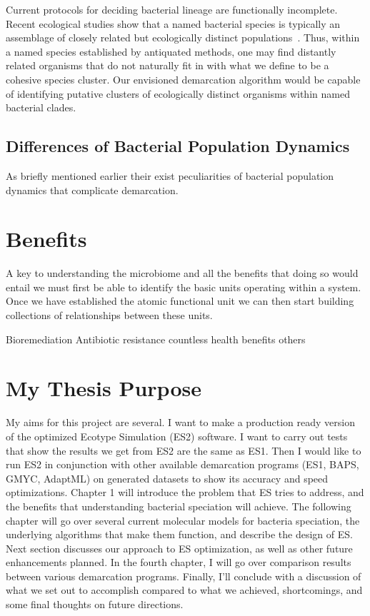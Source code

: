 Current protocols for deciding bacterial lineage are functionally incomplete. Recent ecological studies show that a named bacterial species is typically an assemblage of closely related but ecologically distinct populations~\cite{cohan2007systematics}.
Thus, within a named species established by antiquated methods, one may find distantly related organisms that do not naturally fit in with what we define to be a cohesive species cluster.
Our envisioned demarcation algorithm would be capable of identifying putative clusters of ecologically distinct organisms within named bacterial clades.


\subsection{Differences of Bacterial Population Dynamics}
As briefly mentioned earlier their exist peculiarities of bacterial population dynamics that complicate demarcation.

\section{Benefits}%
A key to understanding the microbiome and all the benefits that doing so would entail we must first be able to identify the basic units operating within a system.
Once we have established the atomic functional unit we can then start building collections of relationships between these units. 


Bioremediation
Antibiotic resistance
countless health benefits
others

\section{My Thesis Purpose}%

My aims for this project are several. I want to make a production ready version of the optimized Ecotype Simulation (ES2) software.
I want to carry out tests that show the results we get from ES2 are the same as ES1. 
Then I would like to run ES2 in conjunction with other available demarcation programs (ES1, BAPS, GMYC, AdaptML) on generated datasets to show its accuracy and speed optimizations.
Chapter 1 will introduce the problem that ES tries to address, and the benefits that understanding bacterial speciation will achieve.
The following chapter will go over several current molecular models for bacteria speciation, the underlying algorithms that make them function, and describe the design of ES.
Next section discusses our approach to ES optimization, as well as other future enhancements planned.
In the fourth chapter, I will go over comparison results between various demarcation programs.
Finally, I'll conclude with a discussion of what we set out to accomplish compared to what we achieved, shortcomings, and some final thoughts on future directions.


